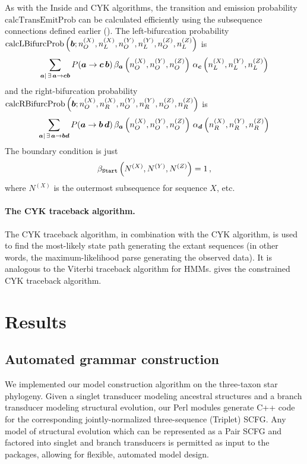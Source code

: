 \documentclass[10pt]{article}
\begin{document}
As with the Inside and CYK algorithms, the transition and emission probability $\mathrm{calcTransEmitProb}$ can be calculated efficiently using the subsequence connections defined earlier ().
The left-bifurcation probability $\mathrm{calcLBifurcProb}\left( \boldsymbol{b}; n^{(X)}_O,n^{(X)}_L,n^{(Y)}_O,n^{(Y)}_L,n^{(Z)}_O,n^{(Z)}_L \right)$ is
\[ \sum_{\boldsymbol{a}|\,\exists\, \boldsymbol{a}\to\boldsymbol{c}\boldsymbol{b}} P (\boldsymbol{a}\to\boldsymbol{c}\,\boldsymbol{b}) \, \beta_{\boldsymbol{a}}\left( n^{(X)}_O,n^{(Y)}_O,n^{(Z)}_O\right) \, \alpha_{\boldsymbol{c}}\left( n^{(X)}_L,n^{(Y)}_L,n^{(Z)}_L\right) \]
and the right-bifurcation probability $\mathrm{calcRBifurcProb}\left( \boldsymbol{b}; n^{(X)}_O,n^{(X)}_R,n^{(Y)}_O,n^{(Y)}_R,n^{(Z)}_O,n^{(Z)}_R \right)$ is
\[ \sum_{\boldsymbol{a}|\,\exists\, \boldsymbol{a}\to\boldsymbol{b}\boldsymbol{d}} P (\boldsymbol{a}\to\boldsymbol{b}\,\boldsymbol{d}) \, \beta_{\boldsymbol{a}}\left( n^{(X)}_O,n^{(Y)}_O,n^{(Z)}_O\right) \, \alpha_{\boldsymbol{d}}\left( n^{(X)}_R,n^{(Y)}_R,n^{(Z)}_R\right) \]
The boundary condition is just
\[
\beta_{\mathtt{Start}} \left(N^{(X)}, N^{(Y)}, N^{(Z)}\right) = 1\, ,
\]
where $N^{(X)}$ is the outermost subsequence for sequence $X$, etc.


\paragraph{The CYK traceback algorithm.}
The CYK traceback algorithm, in combination with the CYK algorithm, is
used to find the most-likely state path generating the extant sequences
(in other words, the maximum-likelihood parse generating the observed data).
It is analogous to the Viterbi traceback algorithm for HMMs.
 gives the constrained CYK traceback algorithm.








\newpage
\section*{Results}



\subsection*{Automated grammar construction}

We implemented our model construction algorithm on the three-taxon
star phylogeny.
Given a singlet transducer modeling ancestral structures and a branch
transducer modeling structural evolution, our Perl modules generate
C++ code for the corresponding jointly-normalized three-sequence
(Triplet) SCFG.
Any model of structural evolution which can be represented as a Pair
SCFG and factored into singlet and branch transducers is permitted as input to
the packages, allowing for flexible, automated model design.
\end{document}
